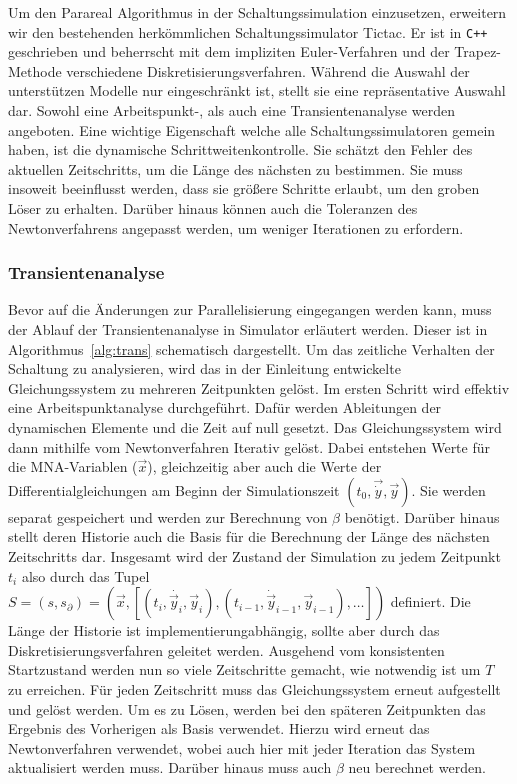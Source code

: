 Um den Parareal Algorithmus in der Schaltungssimulation einzusetzen, erweitern wir den bestehenden herkömmlichen Schaltungssimulator Tictac. Er ist in \texttt{C++} geschrieben und beherrscht mit dem impliziten Euler-Verfahren und der Trapez-Methode verschiedene Diskretisierungsverfahren. Während die Auswahl der unterstützen Modelle nur eingeschränkt ist, stellt sie eine repräsentative Auswahl dar. Sowohl eine Arbeitspunkt-, als auch eine Transientenanalyse werden angeboten. Eine wichtige Eigenschaft welche alle Schaltungssimulatoren gemein haben, ist die dynamische Schrittweitenkontrolle. Sie schätzt den Fehler des aktuellen Zeitschritts, um die Länge des nächsten zu bestimmen. Sie muss insoweit beeinflusst werden, dass sie größere Schritte erlaubt, um den groben Löser zu erhalten. Darüber hinaus können auch die Toleranzen des Newtonverfahrens angepasst werden, um weniger Iterationen zu erfordern.

\subsubsection*{Transientenanalyse}
Bevor auf die Änderungen zur Parallelisierung eingegangen werden kann, muss der Ablauf der Transientenanalyse in Simulator erläutert werden. Dieser ist in Algorithmus~\ref{alg:trans} schematisch dargestellt. Um das zeitliche Verhalten der Schaltung zu analysieren, wird das in der Einleitung entwickelte Gleichungssystem zu mehreren Zeitpunkten gelöst. Im ersten Schritt wird effektiv eine Arbeitspunktanalyse durchgeführt. Dafür werden Ableitungen der dynamischen Elemente und die Zeit auf null gesetzt. Das Gleichungssystem wird dann mithilfe vom Newtonverfahren Iterativ gelöst. Dabei entstehen Werte für die MNA-Variablen (\(\vec{x}\)), gleichzeitig aber auch die Werte der Differentialgleichungen am Beginn der Simulationszeit \((t_0,\vec{\dot{y}},\vec{y})\). Sie werden separat gespeichert und werden zur Berechnung von \(\beta\) benötigt. Darüber hinaus stellt deren Historie auch die Basis für die Berechnung der Länge des nächsten Zeitschritts dar. Insgesamt wird der Zustand der Simulation zu jedem Zeitpunkt \(t_i\) also durch das Tupel \(S = (s,s_\partial) = (\vec{x}, [(t_i,\dot{\vec{y}_i},\vec{y}_i),(t_{i-1},\dot{\vec{y}}_{i-1},\vec{y}_{i-1}),\dots])\) definiert. Die Länge der Historie ist implementierungabhängig, sollte aber durch das Diskretisierungsverfahren geleitet werden. Ausgehend vom konsistenten Startzustand werden nun so viele Zeitschritte gemacht, wie notwendig ist um \(T\) zu erreichen. Für jeden Zeitschritt muss das Gleichungssystem erneut aufgestellt und gelöst werden. Um es zu Lösen, werden bei den späteren Zeitpunkten das Ergebnis des Vorherigen als Basis verwendet. Hierzu wird erneut das Newtonverfahren verwendet, wobei auch hier mit jeder Iteration das System aktualisiert werden muss. Darüber hinaus muss auch \(\beta\) neu berechnet werden.

